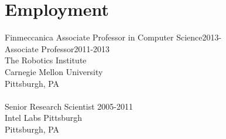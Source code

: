 \section{Employment}
\noindent
Finmeccanica Associate Professor in Computer Science\hfill 2013-\\
Associate Professor\hfill 2011-2013\\
The Robotics Institute\\
Carnegie Mellon University\\
Pittsburgh, PA\\
\\
Senior Research Scientist \hfill 2005-2011\\
Intel Labs Pittsburgh\\
Pittsburgh, PA\\
